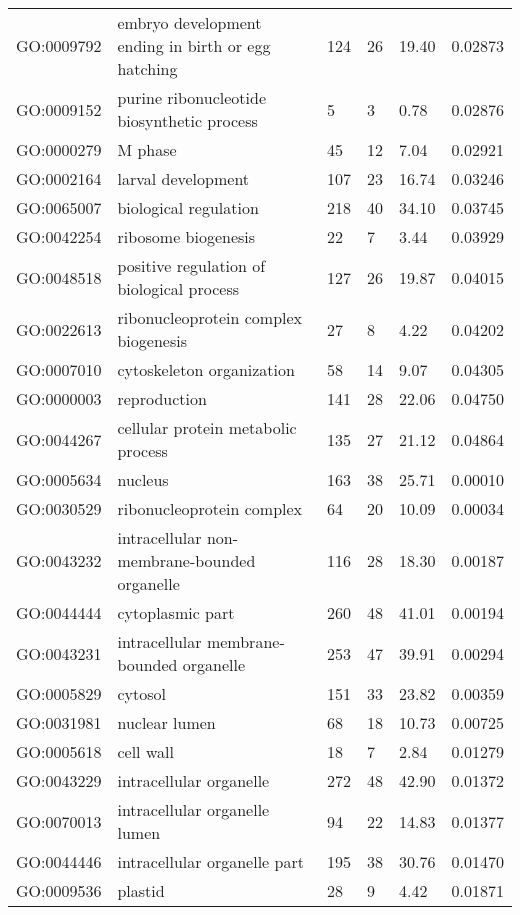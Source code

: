 \documentclass[10pt]{bmc_article}
\newenvironment{bmcformat}{\begin{raggedright}\baselineskip20pt\sloppy\setboolean{publ}{false}}{\end{raggedright}\baselineskip20pt\sloppy}
\begin{document}
\begin{bmcformat}
\begin{longtable}{lp{4.5cm}llll}
  GO:0009792 & embryo development ending in birth or egg hatching & 124 &  26 & 19.40 & 0.02873 \\ 
  GO:0009152 & purine ribonucleotide biosynthetic process &   5 &   3 & 0.78 & 0.02876 \\ 
  GO:0000279 & M phase &  45 &  12 & 7.04 & 0.02921 \\ 
  GO:0002164 & larval development & 107 &  23 & 16.74 & 0.03246 \\ 
  GO:0065007 & biological regulation & 218 &  40 & 34.10 & 0.03745 \\ 
  GO:0042254 & ribosome biogenesis &  22 &   7 & 3.44 & 0.03929 \\ 
  GO:0048518 & positive regulation of biological process & 127 &  26 & 19.87 & 0.04015 \\ 
  GO:0022613 & ribonucleoprotein complex biogenesis &  27 &   8 & 4.22 & 0.04202 \\ 
  GO:0007010 & cytoskeleton organization &  58 &  14 & 9.07 & 0.04305 \\ 
  GO:0000003 & reproduction & 141 &  28 & 22.06 & 0.04750 \\ 
  GO:0044267 & cellular protein metabolic process & 135 &  27 & 21.12 & 0.04864 \\ 
   \hline
GO:0005634 & nucleus & 163 &  38 & 25.71 & 0.00010 \\ 
  GO:0030529 & ribonucleoprotein complex &  64 &  20 & 10.09 & 0.00034 \\ 
  GO:0043232 & intracellular non-membrane-bounded organelle & 116 &  28 & 18.30 & 0.00187 \\ 
  GO:0044444 & cytoplasmic part & 260 &  48 & 41.01 & 0.00194 \\ 
  GO:0043231 & intracellular membrane-bounded organelle & 253 &  47 & 39.91 & 0.00294 \\ 
  GO:0005829 & cytosol & 151 &  33 & 23.82 & 0.00359 \\ 
  GO:0031981 & nuclear lumen &  68 &  18 & 10.73 & 0.00725 \\ 
  GO:0005618 & cell wall &  18 &   7 & 2.84 & 0.01279 \\ 
  GO:0043229 & intracellular organelle & 272 &  48 & 42.90 & 0.01372 \\ 
  GO:0070013 & intracellular organelle lumen &  94 &  22 & 14.83 & 0.01377 \\ 
  GO:0044446 & intracellular organelle part & 195 &  38 & 30.76 & 0.01470 \\ 
  GO:0009536 & plastid &  28 &   9 & 4.42 & 0.01871 \\ 

\end{longtable}
\end{bmcformat}
\end{document}
